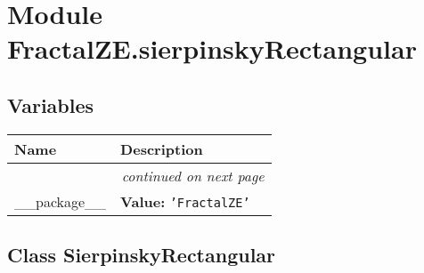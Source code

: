 %
%
%


\section{Module FractalZE.sierpinskyRectangular}

    \label{FractalZE:sierpinskyRectangular}


  \subsection{Variables}

    \vspace{-1cm}
\hspace{\varindent}\begin{longtable}{|p{\varnamewidth}|p{\vardescrwidth}|l}
\cline{1-2}
\cline{1-2} \centering \textbf{Name} & \centering \textbf{Description}& \\
\cline{1-2}
\endhead\cline{1-2}\multicolumn{3}{r}{\small\textit{continued on next page}}\\\endfoot\cline{1-2}
\endlastfoot\raggedright \_\-\_\-p\-a\-c\-k\-a\-g\-e\-\_\-\_\- & \raggedright \textbf{Value:} 
{\tt \texttt{'}\texttt{FractalZE}\texttt{'}}&\\
\cline{1-2}
\end{longtable}



\subsection{Class SierpinskyRectangular}

